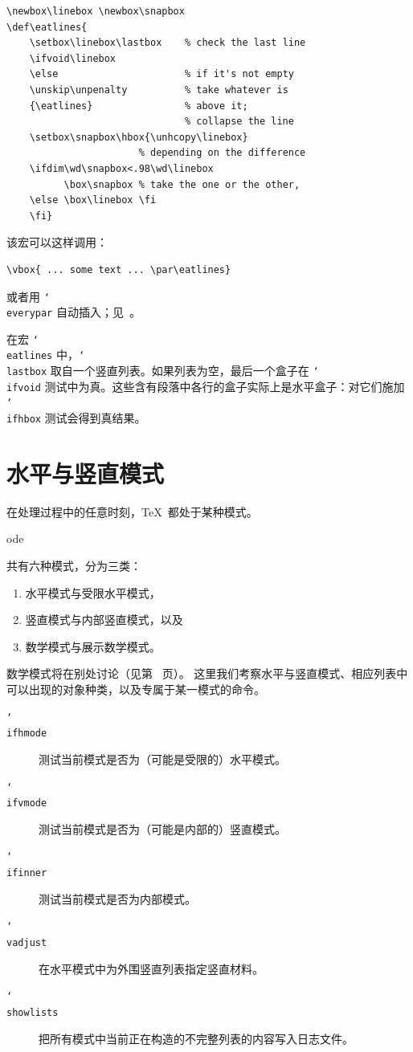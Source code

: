 \documentclass[a4paper]{rapport3}
\def\nl{\protect\\}\def\n#1{{\tt #1}}\def\cs#1{{\tt\char`\\#1}}\let\csc\cs
\newenvironment{inventory}{\begin{description}}{\end{description}}
\def\term#1\par{\index{#1}}
\begin{document}
\begin{verbatim}
\newbox\linebox \newbox\snapbox
\def\eatlines{
    \setbox\linebox\lastbox    % check the last line
    \ifvoid\linebox
    \else                      % if it's not empty
    \unskip\unpenalty          % take whatever is
    {\eatlines}                % above it;
                               % collapse the line
    \setbox\snapbox\hbox{\unhcopy\linebox}
                       % depending on the difference
    \ifdim\wd\snapbox<.98\wd\linebox
          \box\snapbox % take the one or the other,
    \else \box\linebox \fi
    \fi}
\end{verbatim}
该宏可以这样调用：
\begin{verbatim}
\vbox{ ... some text ... \par\eatlines}
\end{verbatim}
或者用 \cs{everypar} 自动插入；见~\cite{E1}。

在宏 \cs{eatlines} 中，\cs{lastbox} 取自一个竖直列表。如果列表为空，最后一个盒子在 \cs{ifvoid} 测试中为真。这些含有段落中各行的盒子实际上是水平盒子：对它们施加 \cs{ifhbox} 测试会得到真结果。


\endofchapter
\chapter{水平与竖直模式}\label{hvmode}

在处理过程中的任意时刻，\TeX\ 都处于某种模式。
\term mode\par
共有六种模式，分为三类：
\begin{enumerate} \item 水平模式与受限水平模式，\item 竖直模式与内部竖直模式，以及
\item 数学模式与展示数学模式。\end{enumerate}
数学模式将在别处讨论（见第~\pageref{math:modes} 页）。
这里我们考察水平与竖直模式、相应列表中可以出现的对象种类，以及专属于某一模式的命令。


\begin{inventory}
\item [\cs{ifhmode}]
      测试当前模式是否为（可能是受限的）水平模式。

\item [\cs{ifvmode}]
      测试当前模式是否为（可能是内部的）竖直模式。

\item [\cs{ifinner}]
      测试当前模式是否为内部模式。

\item [\cs{vadjust}]
      在水平模式中为外围竖直列表指定竖直材料。

\item [\cs{showlists}]
      把所有模式中当前正在构造的不完整列表的内容写入日志文件。
\end{inventory}
\end{document}
